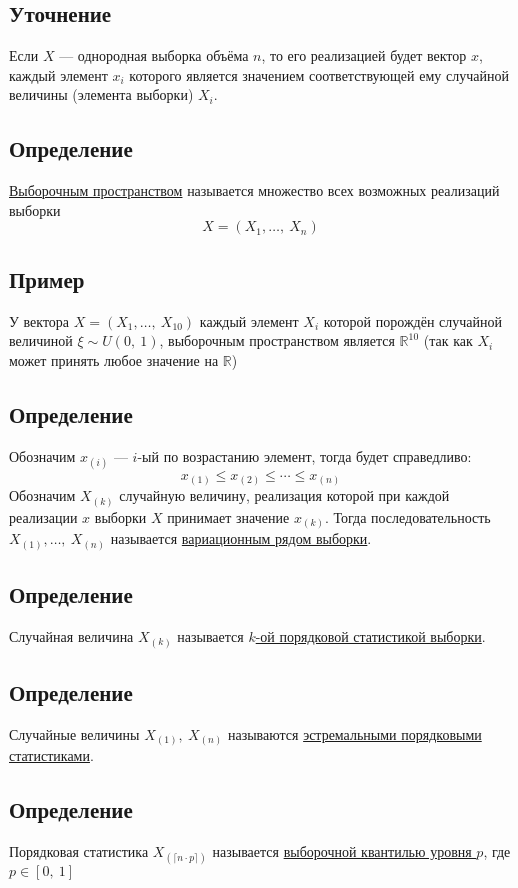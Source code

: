 \documentclass[12pt, a4paper]{article}
\begin{document}
\subsection*{Уточнение}
Если $X$ --- однородная выборка объёма $n$, то его реализацией будет вектор $x$, каждый элемент $x_i$ которого является значением соответствующей ему случайной величины (элемента выборки) $X_i$. 
\subsection*{Определение}
\underline{Выборочным пространством} называется множество всех возможных реализаций выборки\\
\[X = (X_1,\dots,\ X_n)\]
\subsection*{Пример}
У вектора $X = (X_1,\dots,\ X_{10})$ каждый элемент $X_i$ которой порождён случайной величиной $\xi\sim U(0,\ 1)$, выборочным пространством является $\mathbb{R}^{10}$ (так как $X_i$ может принять любое значение на $\mathbb{R}$)
\subsection*{Определение}
Обозначим $x_{(i)}$ --- $i$-ый по возрастанию элемент, тогда будет справедливо:
\[x_{(1)} \leq x_{(2)} \leq \cdots \leq x_{(n)}\]
Обозначим $X_{(k)}$ случайную величину, реализация которой при каждой реализации $x$ выборки $X$ принимает значение $x_{(k)}$. Тогда последовательность $X_{(1)},\dots,\ X_{(n)}$ называется \underline{вариационным рядом выборки}.
\subsection*{Определение}
Случайная величина $X_{(k)}$ называется \underline{$k$-ой порядковой статистикой выборки}.
\subsection*{Определение}
Случайные величины $X_{(1)},\ X_{(n)}$ называются \underline{эстремальными порядковыми статистиками}.
\subsection*{Определение}
Порядковая статистика $X_{(\lceil n\cdot p \rceil)}$ называется \underline{выборочной квантилью уровня $p$}, где $p\in [0,\ 1]$
\end{document}
